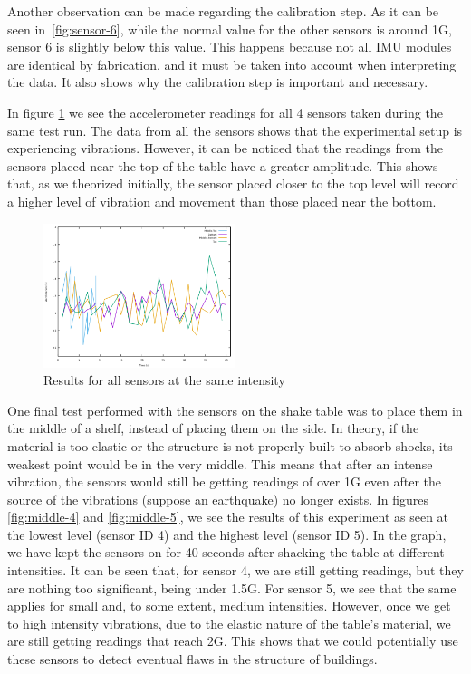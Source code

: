 Another observation can be made regarding the calibration step. As it can be seen in~\ref{fig:sensor-6}, while the normal value for the other sensors is around 1G, sensor 6 is
slightly below this value. This happens because not all IMU modules are identical by fabrication, and it must be taken into account when interpreting the data. It also shows 
why the calibration step is important and necessary.

In figure \ref{fig:same-level} we see the accelerometer readings for all 4 sensors taken during the same test run. The data from all the sensors shows 
that the experimental setup is experiencing vibrations. However, it can be noticed that the readings from the sensors placed near the top of the table have a 
greater amplitude. This shows that, as we theorized initially, the sensor placed closer to the top level will record a higher level of vibration and movement than 
those placed near the bottom.

\begin{figure}[ht] \centering
  \includegraphics[width=0.5\textwidth]{img/same-level-data}
  \caption{Results for all sensors at the same intensity}
  \label{fig:same-level}
\end{figure}

One final test performed with the sensors on the shake table was to place them in the middle of a shelf, instead of placing them on the side. In theory, if the material is too elastic 
or the structure is not properly built to absorb shocks, its weakest point would be in the very middle. This means that after an intense vibration, the sensors would still be getting 
readings of over 1G even after the source of the vibrations (suppose an earthquake) no longer exists. In figures \ref{fig:middle-4} and \ref{fig:middle-5}, we see the results of this 
experiment as seen at the lowest level (sensor ID 4) and the highest level (sensor ID 5). In the graph, we have kept the sensors on for 40 seconds after shacking the table at different 
intensities. It can be seen that, for sensor 4, we are still getting readings, but they are nothing too significant, being under 1.5G. For sensor 5, we see that the same applies for small 
and, to some extent, medium intensities. However, once we get to high intensity vibrations, due to the elastic nature of the table's material, we are still getting readings that reach 2G.
This shows that we could potentially use these sensors to detect eventual flaws in the structure of buildings.

